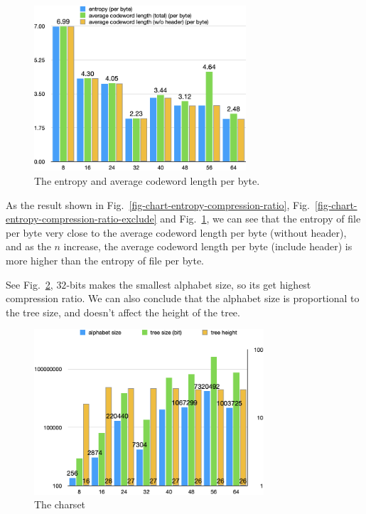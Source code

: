 \documentclass[a4paper,conference]{IEEEtran}
\begin{document}
\begin{figure}[htbp]
\centerline{\includegraphics[height=6.15cm, keepaspectratio,]{assets/chart-entropy-average-codeword-length-per-byte.png}}
\caption{The entropy and average codeword length per byte.}
\label{fig-chart-entropy-average-codeword-length-per-byte}
\end{figure}

As the result shown in Fig.~\ref{fig-chart-entropy-compression-ratio}, Fig.~\ref{fig-chart-entropy-compression-ratio-exclude} and Fig.~\ref{fig-chart-entropy-average-codeword-length-per-byte}, we can see that the entropy of file per byte very close to the average codeword length per byte (without header), and as the $n$ increase, the average codeword length per byte (include header) is more higher than the entropy of file per byte.

See Fig.~\ref{fig-chart-alphabet-size-tree-size-height}, $32$-bits makes the smallest alphabet size, so its get highest compression ratio. We can also conclude that the alphabet size is proportional to the tree size, and doesn't affect the height of the tree.

\begin{figure}[htbp]
\centerline{\includegraphics[height=6.15cm, keepaspectratio,]{assets/chart-alphabet-size-tree-size-height.png}}
\caption{The charset}
\label{fig-chart-alphabet-size-tree-size-height}
\end{figure}
\end{document}
